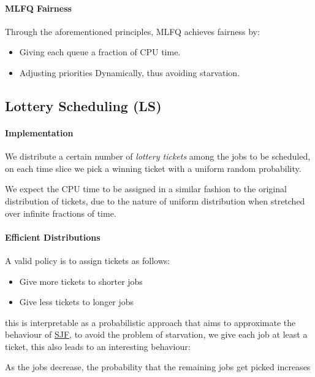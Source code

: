 \documentclass[openright, twoside]{report}
\theoremstyle{definition}
\theoremstyle{example}
\begin{document}
			\paragraph{MLFQ Fairness}
			Through the aforementioned principles, MLFQ achieves fairness by:
			\begin{itemize}
				\item Giving each queue a fraction of CPU time.
				\item Adjusting priorities Dynamically, thus avoiding starvation.
			\end{itemize}

		\subsection{Lottery Scheduling (LS)}
			\label{ssec:lottery}
			\paragraph{Implementation}
			We distribute a certain number of \emph{lottery tickets} among the jobs to be scheduled,
			on each time slice we pick a winning ticket with a uniform random probability.

			We expect the CPU time to be assigned in a similar fashion to the original distribution 
			of tickets, due to the nature of uniform distribution when stretched over infinite fractions
			of time.


			\paragraph{Efficient Distributions}
			A valid policy is to assign tickets as follows:
			\begin{multicols}{2}
				\begin{itemize}
					\item Give more tickets to shorter jobs 
					\item Give less tickets to longer jobs
				\end{itemize}
			\end{multicols}
			

			this is interpretable as a probabilistic approach that aims to approximate the 
			behaviour of
			\hyperref[ssec:SJF]{SJF}, to avoid the problem of starvation, we give each job at
			least a ticket, this also leads to an interesting behaviour: 
			\begin{center}
				As the jobs decrease, the probability that the remaining jobs get picked increases
			\end{center}
\end{document}
